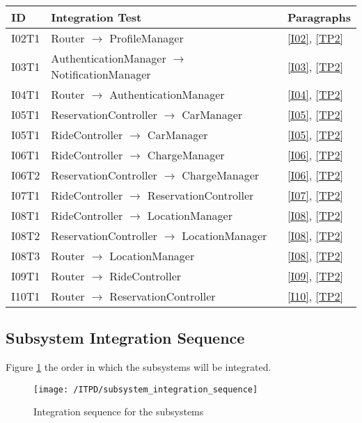 	\begin{center}
		\vspace{0.6cm}
		\begin{tabular}{|l|l|l|}
			\hline
			\textbf{ID} & \textbf{Integration Test} & \textbf{Paragraphs} \bigstrut \\\hline
			\hline
			I02T1 & Router \ensuremath{\rightarrow} ProfileManager & \ref{I02}, \ref{TP2} \bigstrut \\\hline
			I03T1 & AuthenticationManager \ensuremath{\rightarrow} NotificationManager & \ref{I03}, \ref{TP2} \bigstrut \\\hline
			I04T1 & Router \ensuremath{\rightarrow} AuthenticationManager & \ref{I04}, \ref{TP2} \bigstrut \\\hline
			I05T1 & ReservationController \ensuremath{\rightarrow} CarManager & \ref{I05}, \ref{TP2} \bigstrut \\\hline
			I05T1 & RideController \ensuremath{\rightarrow} CarManager & \ref{I05}, \ref{TP2} \bigstrut \\\hline
			I06T1 & RideController \ensuremath{\rightarrow} ChargeManager & \ref{I06}, \ref{TP2} \bigstrut \\\hline
			I06T2 & ReservationController \ensuremath{\rightarrow} ChargeManager & \ref{I06}, \ref{TP2} \bigstrut \\\hline
			I07T1 & RideController \ensuremath{\rightarrow} ReservationController & \ref{I07}, \ref{TP2} \bigstrut \\\hline
			I08T1 & RideController \ensuremath{\rightarrow} LocationManager & \ref{I08}, \ref{TP2} \bigstrut \\\hline
			I08T2 & ReservationController \ensuremath{\rightarrow} LocationManager & \ref{I08}, \ref{TP2} \bigstrut \\\hline
			I08T3 & Router \ensuremath{\rightarrow} LocationManager & \ref{I08}, \ref{TP2} \bigstrut \\\hline
			I09T1 & Router \ensuremath{\rightarrow} RideController & \ref{I09}, \ref{TP2} \bigstrut \\\hline
			I10T1 & Router \ensuremath{\rightarrow} ReservationController & \ref{I10}, \ref{TP2} \bigstrut \\\hline
		\end{tabular}
	\end{center}

	\newpage
	\subsection{Subsystem Integration Sequence}
	Figure \ref{fig:subsystem_integration_sequence} the order in which the subsystems will be integrated.

	\begin{figure}[!ht]
	  \centering
	  \vspace{0.2cm}
	  \texttt{[image: /ITPD/subsystem\_integration\_sequence]}\\
	  \vspace{0.2cm}
	  \caption{Integration sequence for the subsystems} 
	  \label{fig:subsystem_integration_sequence} 
	\end{figure}

